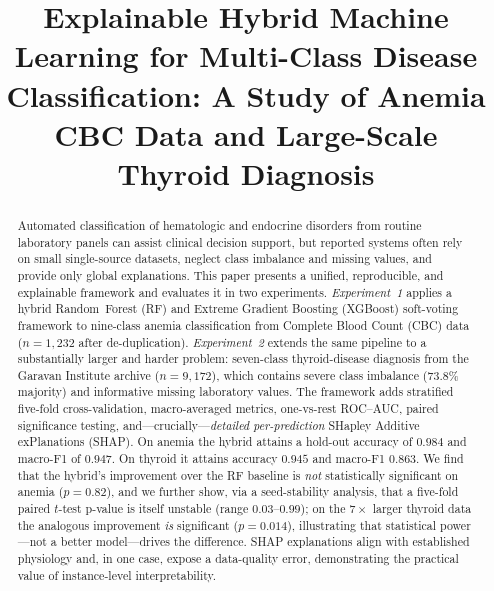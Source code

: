 \documentclass[conference]{IEEEtran}
\begin{document}
\title{Explainable Hybrid Machine Learning for Multi-Class Disease
Classification: A Study of Anemia CBC Data and Large-Scale\\
Thyroid Diagnosis}

\author{
}

\maketitle

\begin{abstract}
Automated classification of hematologic and endocrine disorders from routine
laboratory panels can assist clinical decision support, but reported systems
often rely on small single-source datasets, neglect class imbalance and missing
values, and provide only global explanations. This paper presents a unified,
reproducible, and explainable framework and evaluates it in two experiments.
\emph{Experiment~1} applies a hybrid Random~Forest (RF) and Extreme
Gradient Boosting (XGBoost) soft-voting framework to nine-class anemia
classification from Complete Blood Count (CBC) data ($n{=}1{,}232$ after
de-duplication). \emph{Experiment~2} extends the same pipeline to a substantially
larger and harder problem: seven-class thyroid-disease diagnosis from the Garavan
Institute archive ($n{=}9{,}172$), which contains severe class imbalance
($73.8\%$ majority) and informative missing laboratory values. The framework adds
stratified five-fold cross-validation, macro-averaged metrics, one-vs-rest
ROC--AUC, paired significance testing, and---crucially---\emph{detailed
per-prediction} SHapley Additive exPlanations (SHAP). On anemia the hybrid
attains a hold-out accuracy of $0.984$ and macro-F1 of $0.947$. On thyroid it
attains accuracy $0.945$ and macro-F1 $0.863$. We find that the hybrid's
improvement over the RF baseline is \emph{not} statistically significant on
anemia ($p{=}0.82$),
and we further show, via a seed-stability analysis, that a five-fold paired
$t$-test p-value is itself unstable (range $0.03$--$0.99$); on the $7\times$
larger thyroid data the analogous improvement \emph{is} significant ($p{=}0.014$),
illustrating that statistical power---not a better model---drives the difference.
SHAP explanations align with established physiology and, in one case, expose a
data-quality error, demonstrating the practical value of instance-level
interpretability.
\end{abstract}
\end{document}
